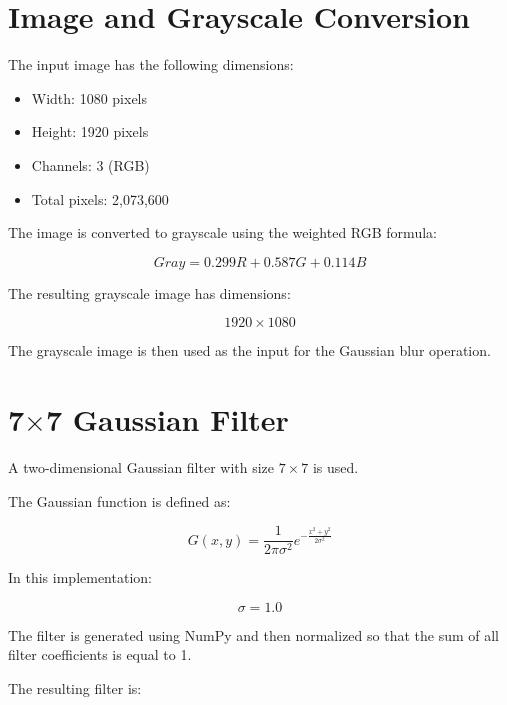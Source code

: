 \documentclass[11pt]{article}
\begin{document}
\section{Image and Grayscale Conversion}

The input image has the following dimensions:

\begin{itemize}
    \item Width: 1080 pixels
    \item Height: 1920 pixels
    \item Channels: 3 (RGB)
    \item Total pixels: 2,073,600
\end{itemize}

The image is converted to grayscale using the weighted RGB formula:

\[
Gray = 0.299R + 0.587G + 0.114B
\]

The resulting grayscale image has dimensions:

\[
1920\times1080
\]

The grayscale image is then used as the input for the Gaussian blur
operation.

\section{7$\times$7 Gaussian Filter}

A two-dimensional Gaussian filter with size $7\times7$ is used.

The Gaussian function is defined as:

\[
G(x,y)=
\frac{1}{2\pi\sigma^2}
e^{-\frac{x^2+y^2}{2\sigma^2}}
\]

In this implementation:

\[
\sigma = 1.0
\]

The filter is generated using NumPy and then normalized so that the sum
of all filter coefficients is equal to 1.

The resulting filter is:
\end{document}
